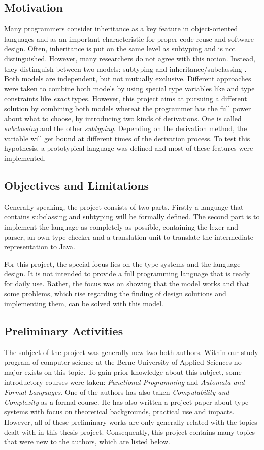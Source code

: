 \subsection{Motivation}
Many programmers consider inheritance as a key feature in object-oriented
languages and as an important characteristic for proper code reuse and
software design. Often, inheritance is put on the same level as subtyping
and is not distinguished. However, many researchers do not agree with
this notion. Instead, they distinguish between two models: subtyping and
inheritance/subclassing \cite{taivalsaari_notion_1996}.
Both models are independent, but not mutually exclusive. Different approaches were
taken to combine both models by using special type variables like \mytype
and type constraints like \emph{exact} types. However, this project aims at
pursuing a different solution by combining both models whereat the programmer has
the full power about what to choose, by introducing two kinds of derivations.
One is called \emph{subclassing} and the other \emph{subtyping}. Depending
on the derivation method, the \mytype variable will get bound at different
times of the derivation process. To test this hypothesis, a prototypical
language was defined and most of these features were implemented.

\subsection{Objectives and Limitations}
Generally speaking, the project consists of two parts. Firstly a language
that contains subclassing and subtyping will be formally defined. The
second part is to implement the language as completely as possible, containing
the lexer and parser, an own type checker and a translation unit to translate
the intermediate representation to Java.

For this project, the special focus lies on the type systems and the
language design. It is not intended to provide a full programming language
that is ready for daily use. Rather, the focus was on showing that the
model works and that some problems, which rise regarding the finding of
design solutions and implementing them, can be solved with this model.

\subsection{Preliminary Activities}
The subject of the project was generally new two both authors. Within
our study program of computer science at the Berne University of Applied
Sciences no major exists on this topic. To gain prior knowledge about
this subject, some introductory courses were taken: \emph{Functional
Programming} and \emph{Automata and Formal Languages}.  One of the
authors has also taken \emph{Computability and Complexity} as a formal
course. He has also written a project paper about type systems with
focus on theoretical backgrounds, practical use and impacts. However,
all of these preliminary works are only generally related with the topics
dealt with in this thesis project. Consequently, this project contains many
topics that were new to the authors, which are listed below.

